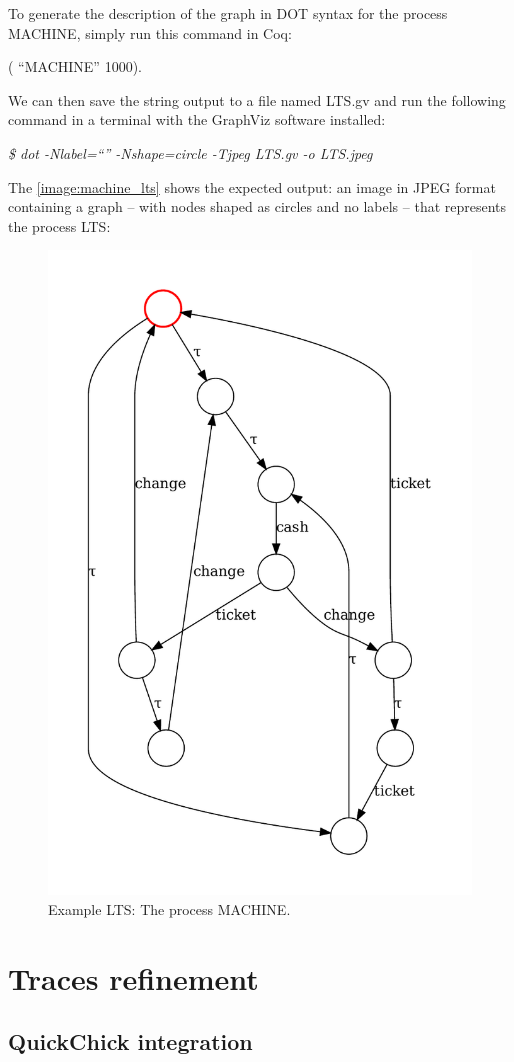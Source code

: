 To generate the description of the graph in DOT syntax for the process MACHINE, simply run this command in Coq:

\begin{coqdoccode}
	\coqdocnoindent
	  (  ``MACHINE'' 1000).\coqdoceol
\end{coqdoccode}

We can then save the string output to a file named LTS.gv and run the following command in a terminal with the GraphViz software installed:

\emph{\$ dot -Nlabel=``'' -Nshape=circle -Tjpeg LTS.gv -o LTS.jpeg}

The \autoref{image:machine_lts} shows the expected output: an image in JPEG format containing a graph -- with nodes shaped as circles and no labels -- that represents the process LTS:

\begin{figure}[htb]
	\caption[Example LTS: The process MACHINE]{Example LTS: The process MACHINE.}
	\label{image:machine_lts}
	\begin{center}
		\includegraphics[scale=0.75]{images/parking_permit_mch_lts.pdf}
	\end{center}
\end{figure}

\section{Traces refinement}
\label{section:traces}

\subsection{QuickChick integration}
